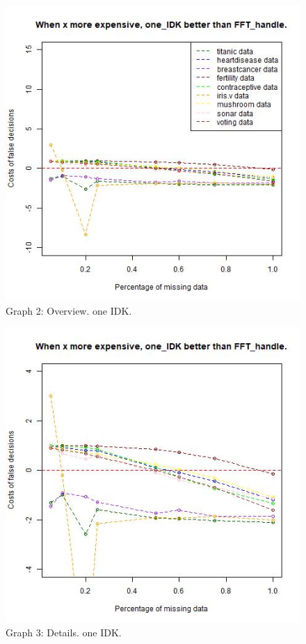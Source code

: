 \documentclass[
]{article}
\begin{document}
\begin{figure}
\centering
\includegraphics{graphs/acc_one_IDK_overview.jpg}
\caption{Graph 2: Overview. one IDK.}
\end{figure}

\begin{figure}
\centering
\includegraphics{graphs/acc_one_IDK_see_better.jpg}
\caption{Graph 3: Details. one IDK.}
\end{figure}
\end{document}
